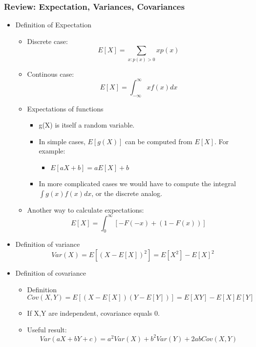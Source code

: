 \documentclass[10pt,containsverbatim,paralist]{article}
\begin{document}
\subsubsection*{Review: Expectation, Variances, Covariances}
\label{sec-1-1-5}
\begin{itemize}
\item Definition of Expectation
\label{sec-1-1-5-1}
\begin{itemize}
\item Discrete case:
\label{sec-1-1-5-1-1}
$$E[X]=\sum_{x:p(x)>0} x p(x)$$
\item Continous case:
\label{sec-1-1-5-1-2}
$$E[X]=\int_{-\infty}^{\infty}x f(x) dx $$
\item Expectations of functions
\label{sec-1-1-5-1-3}
\begin{itemize}
\item g(X) is itself a random variable.
\item In simple cases, $E[g(X)]$ can be computed
from $E[X]$.  For example:
\begin{itemize}
\item $E[aX+b]=aE[X]+b$
\end{itemize}
\item In more complicated cases we would have to compute the integral $\int g(x)f(x)dx$, or the discrete analog.
\end{itemize}
\item Another way to calculate expectations:
$$ E[X] = \int^{\infty}_0[-F(-x)+(1-F(x))]$$
\end{itemize}
\item Definition of variance
\label{sec-1-1-5-2}
$$ Var(X)=E[(X-E[X])^2]=E[X^2]-E[X]^2$$
\item Definition of covariance
\label{sec-1-1-5-3}
\begin{itemize}
\item Definition$$ Cov(X,Y)=E[(X-E[X])(Y-E[Y])]=E[XY]-E[X]E[Y]$$
\item If X,Y are independent, covariance equals 0.
\item Useful result: $$Var(aX+bY+c)=a^2 Var(X)+b^2 Var(Y)+2ab Cov(X,Y)$$
\end{itemize}
\end{itemize}
\end{document}
